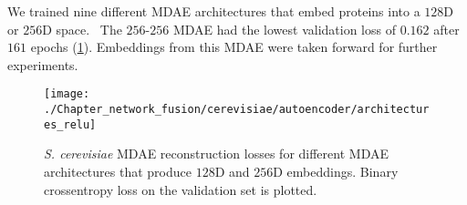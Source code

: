 
We trained nine different MDAE architectures that embed proteins into a $128$D or $256$D space. \mdaarchitectures\ The $256$-$256$ MDAE had the lowest validation loss of $0.162$ after $161$ epochs (\ref{fig:compare-architectures-loss}). Embeddings from this MDAE were taken forward for further experiments.


\begin{figure}[!hbt]
    \centering
    \texttt{[image: ./Chapter\_network\_fusion/cerevisiae/autoencoder/architectures\_relu]}
    \caption{%
        \emph{S. cerevisiae} MDAE reconstruction losses for different MDAE architectures that produce $128$D and $256$D embeddings.
        Binary crossentropy loss on the validation set is plotted.
    }
    \label{fig:compare-architectures-loss}
\end{figure}


